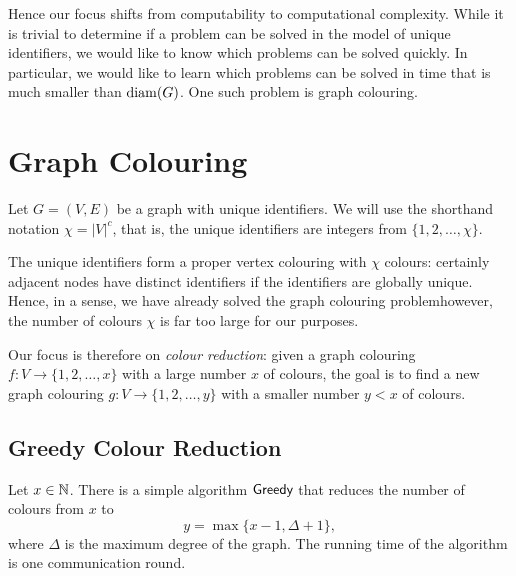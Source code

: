 Hence our focus shifts from computability to computational complexity. While it is trivial to determine if a problem can be solved in the model of unique identifiers, we would like to know which problems can be solved quickly. In particular, we would like to learn which problems can be solved in time that is much smaller than $\operatorname{diam}(G)$. One such problem is graph colouring.


\section{Graph Colouring}

Let $G = (V,E)$ be a graph with unique identifiers. We will use the shorthand notation $\chi = |V|^c$, that is, the unique identifiers are integers from $\{1,2,\dotsc,\chi\}$.

The unique identifiers form a proper vertex colouring with $\chi$ colours: certainly adjacent nodes have distinct identifiers if the identifiers are globally unique. Hence, in a sense, we have already solved the graph colouring problem\mydash however, the number of colours $\chi$ is far too large for our purposes.

Our focus is therefore on \emph{colour reduction}: given a graph colouring $f\colon V \to \{1,2,\dotsc,x\}$ with a large number $x$ of colours, the goal is to find a new graph colouring $g\colon V \to \{1,2,\dotsc,y\}$ with a smaller number $y < x$ of colours.


\subsection{Greedy Colour Reduction}\label{ssec:greedy}

Let $x \in \mathbb{N}$. There is a simple algorithm $\textsf{Greedy}$ that reduces the number of colours from $x$ to
\[
    y = \max \{ x-1, \Delta+1 \},
\]
where $\Delta$ is the maximum degree of the graph. The running time of the algorithm is one communication round.

